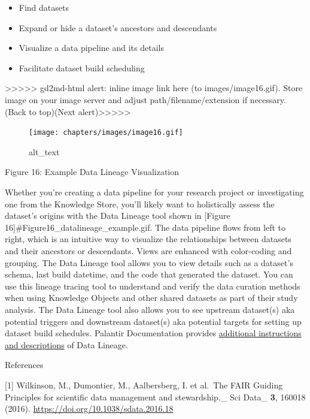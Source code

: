 \documentclass[
  letterpaper,
  DIV=11,
  numbers=noendperiod]{scrreprt}
\providecommand{\tightlist}{%
  \setlength{\itemsep}{0pt}\setlength{\parskip}{0pt}}\usepackage{longtable,booktabs,array}
\begin{document}
\begin{itemize}
\tightlist
\item
  Find datasets
\item
  Expand or hide a dataset's ancestors and descendants
\item
  Visualize a data pipeline and its details
\item
  Facilitate dataset build scheduling
\end{itemize}

{\textgreater\textgreater\textgreater\textgreater\textgreater{}
gd2md-html alert: inline image link here (to images/image16.gif). Store
image on your image server and adjust path/filename/extension if
necessary. }(Back to top)(Next
alert){\textgreater\textgreater\textgreater\textgreater\textgreater{} }

\begin{figure}

{\centering \texttt{[image: chapters/images/image16.gif]}

}

\caption{alt\_text}

\end{figure}

Figure 16: Example Data Lineage Visualization

Whether you're creating a data pipeline for your research project or
investigating one from the Knowledge Store, you'll likely want to
holistically assess the dataset's origins with the Data Lineage tool
shown in {[}Figure 16{]}\#Figure16\_datalineage\_example.gif. The data
pipeline flows from left to right, which is an intuitive way to
visualize the relationships between datasets and their ancestors or
descendants. Views are enhanced with color-coding and grouping. The Data
Lineage tool allows you to view details such as a dataset's schema, last
build datetime, and the code that generated the dataset. You can use
this lineage tracing tool to understand and verify the data curation
methods when using Knowledge Objects and other shared datasets as part
of their study analysis. The Data Lineage tool also allows you to see
upstream dataset(s) aka potential triggers and downstream dataset(s) aka
potential targets for setting up dataset build schedules. Palantir
Documentation provides
\href{https://www.palantir.com/docs/foundry/data-lineage/overview/}{additional
instructions and descriptions} of Data Lineage.

References

{[}1{]} Wilkinson, M., Dumontier, M., Aalbersberg, I. et al.~The FAIR
Guiding Principles for scientific data management and stewardship.\_ Sci
Data\_ \textbf{3}, 160018 (2016).
\url{https://doi.org/10.1038/sdata.2016.18}
\end{document}
